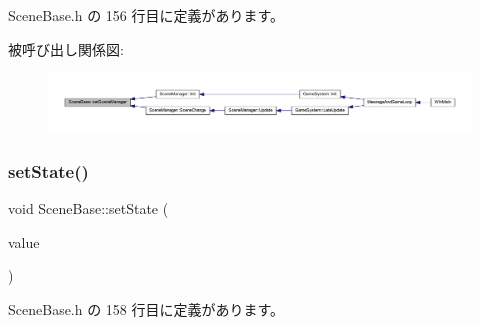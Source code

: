  Scene\+Base.\+h の 156 行目に定義があります。

被呼び出し関係図\+:
\nopagebreak
\begin{figure}[H]
\begin{center}
\leavevmode
\includegraphics[width=350pt]{class_scene_base_aae1930cae97c27ee7d54b4bd8896a515_icgraph}
\end{center}
\end{figure}
\mbox{\label{class_scene_base_a95d33774db6a05cf1e9da201720ea3db}} 
\subsubsection{\texorpdfstring{set\+State()}{setState()}}
{\footnotesize\ttfamily void Scene\+Base\+::set\+State (\begin{DoxyParamCaption}\item[{\mbox{\hyperlink{class_scene_base_1_1_state_base}{State\+Base}} $\ast$}]{value }\end{DoxyParamCaption})\hspace{0.3cm}{\ttfamily [inline]}}



 Scene\+Base.\+h の 158 行目に定義があります。

